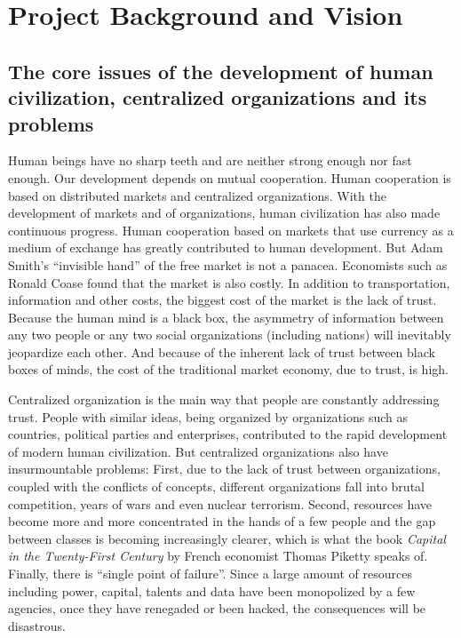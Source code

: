 \documentclass[a4paper,12pt]{article}
\begin{document}
\cfoot{}

\section{Project Background and Vision}

\subsection{The core issues of the development of human civilization, centralized organizations and its problems}

Human beings have no sharp teeth and are neither strong enough nor fast enough. Our development depends on mutual cooperation. Human cooperation is based on distributed markets and centralized organizations. With the development of markets and of organizations, human civilization has also made continuous progress. Human cooperation based on markets that use currency as a medium of exchange has greatly contributed to human development. But Adam Smith's “invisible hand” of the free market is not a panacea. Economists such as Ronald Coase \citeyearpar{coase1937nature} found that the market is also costly. In addition to transportation, information and other costs, the biggest cost of the market is the lack of trust. Because the human mind is a black box, the asymmetry of information between any two people or any two social organizations (including nations) will inevitably jeopardize each other. And because of the inherent lack of trust between black boxes of minds, the cost of the traditional market economy, due to trust, is high.

Centralized organization is the main way that people are constantly addressing trust. People with similar ideas, being organized by organizations such as countries, political parties and enterprises, contributed to the rapid development of modern human civilization. But centralized organizations also have insurmountable problems: First, due to the lack of trust between organizations, coupled with the conflicts of concepts, different organizations fall into brutal competition, years of wars and even nuclear terrorism. Second, resources have become more and more concentrated in the hands of a few people and the gap between classes is becoming increasingly clearer, which is what the book \textit{Capital in the Twenty-First Century} by French economist Thomas Piketty speaks of. Finally, there is “single point of failure”. Since a large amount of resources including power, capital, talents and data have been monopolized by a few agencies, once they have renegaded or been hacked, the consequences will be disastrous.
\end{document}
